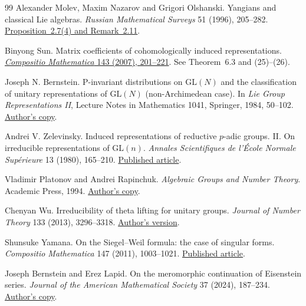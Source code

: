 \begin{thebibliography}{99}
Alexander Molev, Maxim Nazarov and Grigori Olshanski.
Yangians and classical Lie algebras.
\emph{Russian Mathematical Surveys} 51 (1996), 205--282.
\href{https://arxiv.org/pdf/hep-th/9409025}{Proposition~2.7(4) and Remark~2.11}.

Binyong Sun.
Matrix coefficients of cohomologically induced representations.
\href{https://doi.org/10.1112/S0010437X06002508}{\emph{Compositio Mathematica} 143 (2007), 201--221}.
See Theorem~6.3 and (25)--(26).

Joseph N. Bernstein.
P-invariant distributions on \(\mathrm{GL}(N)\) and the classification
of unitary representations of \(\mathrm{GL}(N)\) (non-Archimedean case).
In \emph{Lie Group Representations II}, Lecture Notes in Mathematics
1041, Springer, 1984, 50--102.
\href{https://www.math.tau.ac.il/~bernstei/Publication_list/publication_texts/Bernstein-P-invar-SLN.pdf}{Author's copy}.

Andrei V. Zelevinsky.
Induced representations of reductive \(p\)-adic groups. II.
On irreducible representations of \(\mathrm{GL}(n)\).
\emph{Annales Scientifiques de l'\'Ecole Normale Sup\'erieure}
13 (1980), 165--210.
\href{https://numdam.org/item/10.24033/asens.1379.pdf}{Published article}.

Vladimir Platonov and Andrei Rapinchuk.
\emph{Algebraic Groups and Number Theory}.
Academic Press, 1994.
\href{https://uva.theopenscholar.com/files/andrei-rapinchuk/files/agnt_english.pdf}{Author's copy}.

Chenyan Wu.
Irreducibility of theta lifting for unitary groups.
\emph{Journal of Number Theory} 133 (2013), 3296--3318.
\href{https://arxiv.org/pdf/1409.0770\#page=9}{Author's version}.

Shunsuke Yamana.
On the Siegel--Weil formula: the case of singular forms.
\emph{Compositio Mathematica} 147 (2011), 1003--1021.
\href{https://doi.org/10.1112/S0010437X11005379}{Published article}.

Joseph Bernstein and Erez Lapid.
On the meromorphic continuation of Eisenstein series.
\emph{Journal of the American Mathematical Society} 37 (2024), 187--234.
\href{https://www.math.tau.ac.il/~bernstei/Publication_list/publication_texts/2023-10-15-Eisenstein-series-JAMS.pdf}{Author's copy}.


\end{thebibliography}
